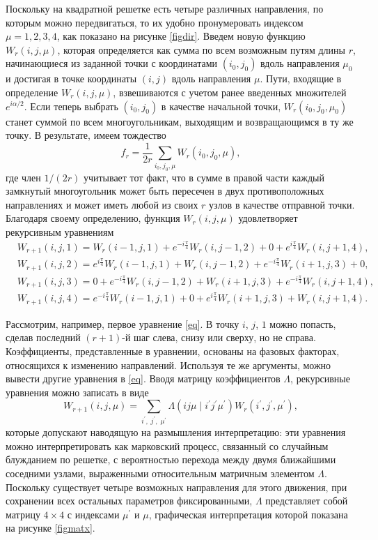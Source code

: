 Поскольку на квадратной решетке есть четыре различных направления, по которым можно передвигаться, то их удобно пронумеровать индексом $\mu = 1, 2, 3, 4$, как показано на рисунке \ref{figdir}. Введем новую функцию $W_r (i, j, \mu)$, которая определяется как сумма по всем возможным путям длины $r$, начинающиеся из заданной точки с координатами $(i_0, j_0)$ вдоль направления $\mu_0$ и достигая в точке координаты $(i, j)$ вдоль направления $\mu$. Пути, входящие в определение $W_r (i, j, \mu)$, взвешиваются с учетом ранее введенных множителей $e^{i\alpha / 2}$. Если теперь выбрать $(i_0, j_0)$ в качестве начальной точки, $W_r (i_0, j_0, \mu_0)$ станет суммой по всем многоугольникам, выходящим и возвращающимся в ту же точку. В результате, имеем тождество
\begin{equation}
f_{r} = \frac{1}{2r} \sum_{i_0, j_0, \mu} W_r (i_0, j_0, \mu),
\label{fl}
\end{equation}
где член $1 / (2r)$ учитывает тот факт, что в сумме в правой части каждый замкнутый многоугольник может быть пересечен в двух противоположных направлениях и может иметь любой из своих $r$ узлов в качестве отправной точки. Благодаря своему определению, функция $W_r (i, j, \mu)$ удовлетворяет рекурсивным уравнениям
\begin{align}
&W_{r+1} (i, j, 1) = W_r (i − 1, j, 1) + e^{−i \frac{\pi}{4}} W_r (i, j − 1, 2) + 0 + e^{i \frac{\pi}{4}} W_r (i, j + 1, 4), \nonumber \\
&W_{r+1} (i, j, 2) = e^{i \frac{\pi}{4}} W_r (i − 1, j, 1) + W_r (i, j − 1, 2) + e^{−i \frac{\pi}{4}} W_r (i + 1, j, 3) + 0, \nonumber\\
& W_{r+1} (i, j, 3) = 0 + e^{−i \frac{\pi}{4}} W_r (i, j − 1, 2) + W_r (i + 1, j, 3) + e^{-i\frac{\pi}{4}} W_r (i, j + 1, 4), \nonumber\\
& W_{r+1} (i, j, 4) = e^{−i \frac{\pi}{4}} W_r (i − 1, j, 1) + 0 + e^{i \frac{\pi}{4}} W_r (i + 1, j, 3) + W_r (i, j + 1, 4).
\label{eq}
\end{align}

Рассмотрим, например, первое уравнение \eqref{eq}. В точку $i$, $j$, $1$ можно попасть, сделав последний $(r + 1)$-й шаг слева, снизу или сверху, но не справа. Коэффициенты, представленные в уравнении, основаны на фазовых факторах, относящихся к изменению направлений. Используя те же аргументы, можно вывести другие уравнения в \eqref{eq}. Вводя матрицу коэффициентов $\Lambda$, рекурсивные уравнения можно записать в виде
\begin{equation}
W_{r+1}(i, j, \mu) = \sum_{i^{'},\; j^{'},\; \mu^{'}} \Lambda (ij\mu\; |\; i^{'}j^{'}\mu^{'}) W_{r} (i^{'}, j^{'}, \mu^{'}),
\end{equation}
которые допускают наводящую на размышления интерпретацию: эти уравнения можно интерпретировать как марковский процесс, связанный со случайным блужданием по решетке, с вероятностью перехода между двумя ближайшими соседними узлами, выраженными относительным матричным элементом $\Lambda$. Поскольку существует четыре возможных направления для этого движения, при сохранении всех остальных параметров фиксированными, $\Lambda$ представляет собой матрицу $4 \times 4$ с индексами $\mu^{'}$ и $\mu$, графическая интерпретация которой показана на рисунке \ref{figmatx}.

